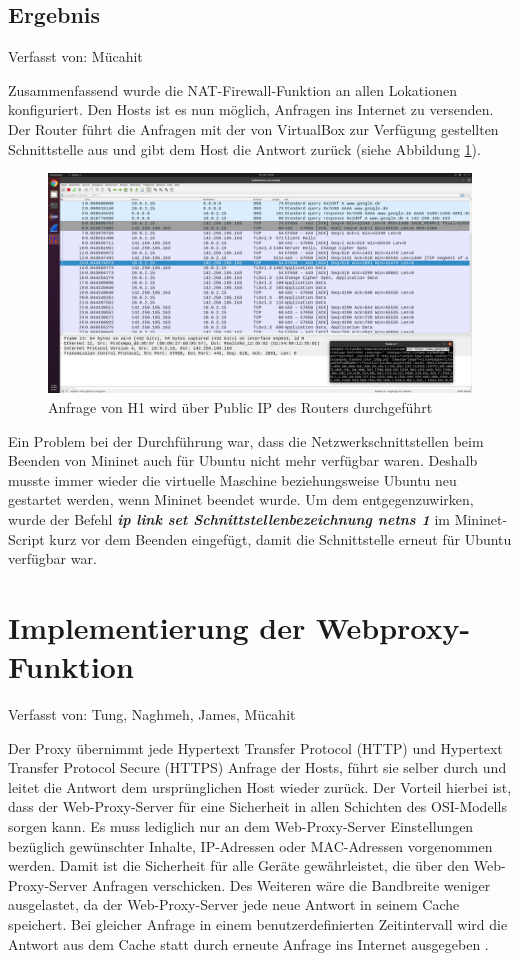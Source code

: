 \documentclass[fontsize=12pt,paper=a4,open=any,parskip=half,
  twoside=false,toc=listof,toc=bibliography,fleqn,leqno,
  captions=nooneline,captions=tableabove,british]{scrbook}
\begin{document}
\subsection{Ergebnis}
{\tiny Verfasst von: Mücahit\par}
Zusammenfassend wurde die NAT-Firewall-Funktion an allen Lokationen konfiguriert. Den Hosts ist es nun möglich, Anfragen ins Internet zu versenden. Der Router führt die Anfragen mit der von VirtualBox zur Verfügung gestellten Schnittstelle aus und gibt dem Host die Antwort zurück (siehe Abbildung \ref{nat}).

\begin{figure}[H]
 \centering
 \includegraphics[width=1.0\textwidth]{Bilder/nat}
 \captionsetup{justification=centering}
 \caption{Anfrage von H1 wird über Public IP des Routers durchgeführt}
 \label{nat}
\end{figure}

Ein Problem bei der Durchführung war, dass die Netzwerkschnittstellen beim Beenden von Mininet auch für Ubuntu nicht mehr verfügbar waren. Deshalb musste immer wieder die virtuelle Maschine beziehungsweise Ubuntu neu gestartet werden, wenn Mininet beendet wurde. Um dem entgegenzuwirken, wurde der Befehl \textit{\textbf{ip link set Schnittstellenbezeichnung netns 1}} im Mininet-Script kurz vor dem Beenden eingefügt, damit die Schnittstelle erneut für Ubuntu verfügbar war.

\newpage
\section{Implementierung der Webproxy-Funktion}
{\tiny Verfasst von: Tung, Naghmeh, James, Mücahit\par}
Der Proxy übernimmt jede Hypertext Transfer Protocol (HTTP) und Hypertext Transfer Protocol Secure (HTTPS) Anfrage der Hosts, führt sie selber durch und leitet die Antwort dem ursprünglichen Host wieder zurück. Der Vorteil hierbei ist, dass der Web-Proxy-Server für eine Sicherheit in allen Schichten des OSI-Modells sorgen kann. Es muss lediglich nur an dem Web-Proxy-Server Einstellungen bezüglich gewünschter Inhalte, IP-Adressen oder MAC-Adressen vorgenommen werden. Damit ist die Sicherheit für alle Geräte gewährleistet, die über den Web-Proxy-Server Anfragen verschicken. Des Weiteren wäre die Bandbreite weniger ausgelastet, da der Web-Proxy-Server jede neue Antwort in seinem Cache speichert. Bei gleicher Anfrage in einem benutzerdefinierten Zeitintervall wird die Antwort aus dem Cache statt durch erneute Anfrage ins Internet ausgegeben \cite{webproxyosi}.
\end{document}
